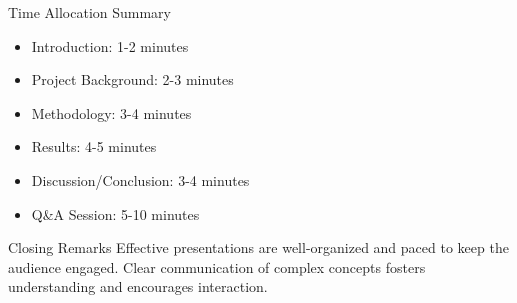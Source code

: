 \documentclass{beamer}
\begin{document}
\begin{frame}[fragile]
    \begin{block}{Time Allocation Summary}
        \begin{itemize}
            \item Introduction: 1-2 minutes
            \item Project Background: 2-3 minutes
            \item Methodology: 3-4 minutes
            \item Results: 4-5 minutes
            \item Discussion/Conclusion: 3-4 minutes
            \item Q\&A Session: 5-10 minutes
        \end{itemize}
    \end{block}
    
    \begin{block}{Closing Remarks}
        Effective presentations are well-organized and paced to keep the audience engaged. 
        Clear communication of complex concepts fosters understanding and encourages interaction.
    \end{block}
\end{frame}
\end{document}
